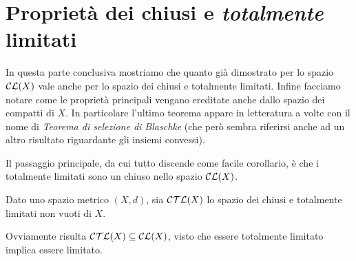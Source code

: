 \section{Proprietà dei chiusi e \emph{totalmente} limitati}
In questa parte conclusiva mostriamo che quanto già dimostrato per lo spazio $\mathcal{CL}(X)$ vale anche per lo spazio dei chiusi e totalmente limitati. Infine facciamo notare come le proprietà principali vengano ereditate anche dallo spazio dei compatti di $X$. In particolare l'ultimo teorema appare in letteratura a volte con il nome di \emph{Teorema di selezione di Blaschke} (che però sembra riferirsi anche ad un altro risultato riguardante gli insiemi convessi).

Il passaggio principale, da cui tutto discende come facile corollario, è che i totalmente limitati sono un chiuso nello spazio $\mathcal{CL}(X)$.

\begin{definition}
	Dato uno spazio metrico $(X,d)$, sia $\mathcal{CTL}(X)$ lo spazio dei chiusi e totalmente limitati non vuoti di $X$.
\end{definition}
\begin{remark}\label{SottoinsiemeCTL}
	Ovviamente risulta $\mathcal{CTL}(X)\subseteq \mathcal{CL}(X)$, visto che essere totalmente limitato implica essere limitato.
\end{remark}

